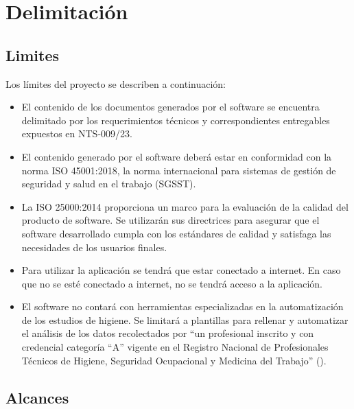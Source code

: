 
\section{Delimitación}
\subsection{Limites}

\noindent
Los límites del proyecto se describen a continuación:

\begin{itemize}[topsep=0pt]
	\item El contenido de los documentos generados por el software se encuentra delimitado por los requerimientos técnicos y correspondientes entregables expuestos en NTS-009/23. 
	\item El contenido generado por el software deberá estar en conformidad con la norma ISO 45001:2018, la norma internacional para sistemas de gestión de seguridad y salud en el trabajo (SGSST).
	\item La ISO 25000:2014 proporciona un marco para la evaluación de la calidad del producto de software. Se utilizarán sus directrices para asegurar que el software desarrollado cumpla con los estándares de calidad y satisfaga las necesidades de los usuarios finales.
	\item Para utilizar la aplicación se tendrá que estar conectado a internet. 
	En caso que no se esté conectado a internet, no se tendrá acceso a la aplicación.
	\item El software no contará con herramientas especializadas en la automatización de los estudios de higiene. Se limitará a plantillas para rellenar y automatizar el análisis de los datos recolectados por ``un profesional inscrito y con credencial categoría ``A'' vigente en el Registro Nacional de Profesionales Técnicos de Higiene, Seguridad Ocupacional y Medicina del Trabajo'' (\cite{NTS-009/23}).
\end{itemize}

\subsection{Alcances}

